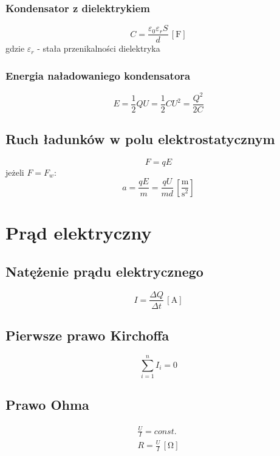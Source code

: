 \documentclass{article}
\numberwithin{equation}{section}
\newcommand{\unit}[1]{\, \left[\mathrm{#1}\right]}
\begin{document}
      \subsubsection{Kondensator z dielektrykiem}
      \begin{equation}
        C= \frac{\varepsilon_0\varepsilon_rS}{d} \unit{F}
      \end{equation}
      gdzie $\varepsilon_r$ - stała przenikalności dielektryka
      \subsubsection{Energia naładowaniego kondensatora}
        \begin{equation}
          E = \frac{1}{2}QU = \frac{1}{2}CU^2 = \frac{Q^2}{2C}
        \end{equation}
    \subsection{Ruch ładunków w polu elektrostatycznym}
      \begin{equation}
        F = qE
      \end{equation}
      jeżeli $F = F_w$:
      \begin{equation}
        a = \frac{qE}{m} = \frac{qU}{md} \unit{\frac{m}{s^2}}
      \end{equation}

  \newpage
  \section{Prąd elektryczny}
    \subsection{Natężenie prądu elektrycznego}
      \begin{equation}
        I = \frac{\Delta Q}{\Delta t} \unit{A}
      \end{equation}
    \subsection{Pierwsze prawo Kirchoffa}
      \begin{equation}
        \sum_{i=1}^n I_i = 0
      \end{equation}
    \subsection{Prawo Ohma}
      \begin{gather}
        \frac{U}{I} = const.\\
        R = \frac{U}{I} \unit{\Omega}
      \end{gather}
\end{document}
